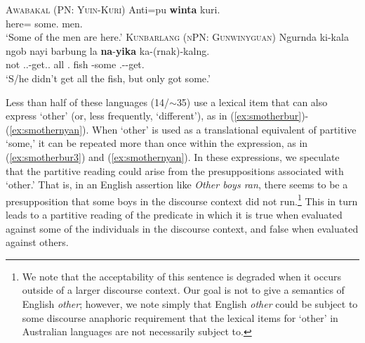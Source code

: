 \documentclass[12pt,egregdoesnotlikesansseriftitles]{scrartcl}
\begin{document}


\begin{exe}
  \ex\label{ex:specsmawa} \textsc{Awabakal (PN: Yuin-Kuri)}\hfill {}
  \gll Anti=pu \textbf{winta} kuri.\\
  here=\Excl{} some.\Abs{} men.\Abs\\
  \glt `Some of the men are here.' %
  \ex\label{ex:specsmwlg} \textsc{Kunbarlang (nPN: Gunwinyguan)}\hfill \citep{ikthesis}
  \gll Ngurnda ki-kala ngob nayi barbung la \textbf{na}-\textbf{yika} ka-(rnak)-kalng.\\
  not \Tsg.\Irr.\Pst-get.\Irr.\Pst{} all \Nm.\Cli{} fish \Conj{} \Cli-some \Tsg.\Nfut-\Lim-get.\Pst\\
  \glt `S/he didn't get all the fish, but only got some.' %
\end{exe}

Less than half of these languages (14/$\sim$35) use a lexical item that can also express `other' (or, less frequently, `different'),  as in (\ref{ex:smotherbur})-(\ref{ex:smothernyan}). When `other' is used as a translational equivalent of partitive `some,' it can be repeated more than once within the expression, as in (\ref{ex:smotherbur3}) and (\ref{ex:smothernyan}). In these expressions, we speculate that the partitive reading could arise from the presuppositions associated with `other.' That is, in an English assertion like \textit{Other boys ran}, there seems to be a presupposition that some boys in the discourse context did not run.\footnote{We note that the acceptability of this sentence is degraded when it occurs outside of a larger discourse context.  Our goal is not to give a semantics of English \textit{other}; however, we note simply that English \textit{other} could be subject to some discourse anaphoric requirement that the lexical items for `other' in Australian languages are not necessarily subject to.} This in turn leads to a partitive reading of the predicate in which it is true when evaluated against some of the individuals in the discourse context, and false when evaluated against others. 
\end{document}
